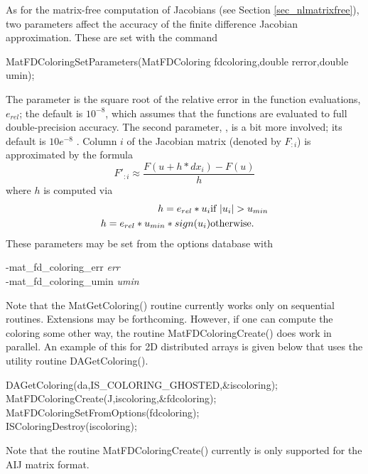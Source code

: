 As for the matrix-free computation of Jacobians (see Section
\ref{sec_nlmatrixfree}), two parameters affect the accuracy of the
finite difference Jacobian approximation.  These are set with the command
\begin{tabbing}
  MatFDColoringSetParameters(MatFDColoring fdcoloring,double rerror,double umin);
\end{tabbing}
The parameter  is the square root of 
the relative error in the function evaluations, $e_{rel}$; the default is $ 10^{-8} $, which assumes
that the functions are evaluated to full double-precision accuracy. The 
second parameter, , is a bit more involved; its default is 
$ 10e^{-8} $ .  Column $i$ of the Jacobian matrix (denoted by $F_{:i}$) is 
approximated by the formula
\[
    F'_{:i} \approx \frac{F(u + h*dx_{i}) - F(u)}{h}
\]
where $ h $ is computed via 
\begin{eqnarray*}
        h = e_{rel}*u_{i}             &    \hbox{if }  |u_{i}| > u_{min} \\
        h = e_{rel}*u_{min}*sign(u_{i})  &    \hbox{otherwise}.
\end{eqnarray*}
These parameters may be set from the options database with 
\begin{tabbing}
   -mat\_fd\_coloring\_err {\em err}\\
   -mat\_fd\_coloring\_umin {\em umin}
\end{tabbing}
 

Note that the MatGetColoring() routine currently 
works only on sequential routines.  Extensions may be forthcoming. However,
if one can compute the coloring  some other way, the routine
MatFDColoringCreate() does work in parallel. An example of this for 
2D distributed arrays is given below that uses the utility routine
DAGetColoring(). 

\begin{tabbing}
   DAGetColoring(da,IS\_COLORING\_GHOSTED,\&iscoloring);\\
   MatFDColoringCreate(J,iscoloring,\&fdcoloring); \\
   MatFDColoringSetFromOptions(fdcoloring);\\
   ISColoringDestroy(iscoloring);
\end{tabbing}

Note that the routine MatFDColoringCreate() currently is only 
supported for the AIJ matrix format.

